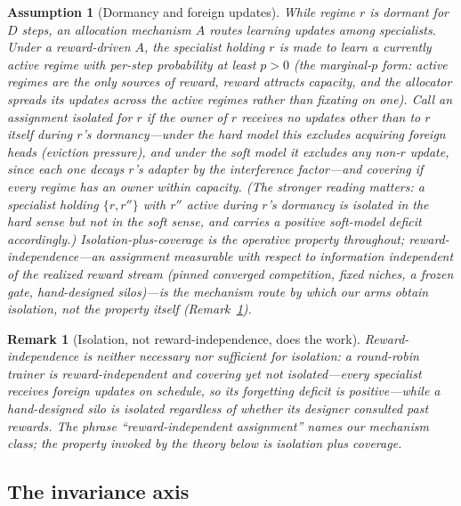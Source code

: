 \documentclass{article}
\newtheorem{remark}{Remark}
\newtheorem{assumption}{Assumption}
\begin{document}
\begin{assumption}[Dormancy and foreign updates]
\label{ass:dormancy}
While regime $r$ is dormant for $D$ steps, an allocation mechanism $A$
routes learning updates among specialists. Under a \emph{reward-driven} $A$,
the specialist holding $r$ is made to learn a currently active regime with
per-step probability at least $p > 0$ (the \emph{marginal-$p$ form}:
active regimes are the only sources of reward, reward attracts capacity,
and the allocator spreads its updates across the active regimes rather
than fixating on one). Call an assignment \emph{isolated} for $r$ if the
owner of $r$ receives no updates \emph{other than to $r$ itself} during
$r$'s dormancy---under the hard model this excludes acquiring foreign
heads (eviction pressure), and under the soft model it excludes
\emph{any} non-$r$ update, since each one decays $r$'s adapter by the
interference factor---and \emph{covering} if every regime has an owner
within capacity. (The stronger reading matters: a specialist holding
$\{r, r''\}$ with $r''$ active during $r$'s dormancy is isolated in the
hard sense but not in the soft sense, and carries a positive soft-model
deficit accordingly.)
Isolation-plus-coverage is the operative property throughout;
\emph{reward-independence}---an assignment measurable with respect to
information independent of the realized reward stream (pinned converged
competition, fixed niches, a frozen gate, hand-designed silos)---is the
mechanism route by which our arms obtain isolation, not the property
itself (Remark~\ref{rem:isolation}).
\end{assumption}

\begin{remark}[Isolation, not reward-independence, does the work]
\label{rem:isolation}
Reward-independence is neither necessary nor sufficient for isolation: a
round-robin trainer is reward-independent and covering yet not
isolated---every specialist receives foreign updates on schedule, so its
forgetting deficit is positive---while a hand-designed silo is isolated
regardless of whether its designer consulted past rewards. The phrase
``reward-independent assignment'' \citep{li2026gause} names our mechanism
class; the property invoked by the theory below is isolation plus
coverage.
\end{remark}

\subsection{The invariance axis}
\end{document}
